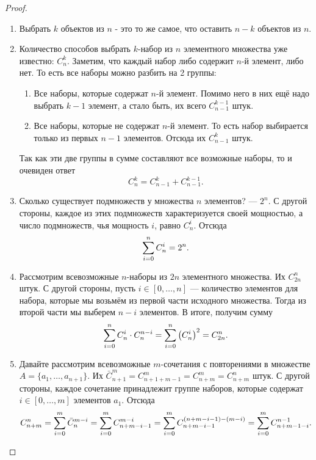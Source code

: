 \begin{proof}~
	\begin{enumerate}
		\item Выбрать $k$ объектов из $n$ - это то же самое, что оставить $n - k$ объектов из $n$.
		
		\item Количество способов выбрать $k$-набор из $n$ элементного множества уже известно: $C_n^k$. Заметим, что каждый набор либо содержит $n$-й элемент, либо нет. То есть все наборы можно разбить на 2 группы:
		\begin{enumerate}
			\item Все наборы, которые содержат $n$-й элемент. Помимо него в них ещё надо выбрать $k - 1$ элемент, а стало быть, их всего $C_{n - 1}^{k - 1}$ штук.
			
			\item Все наборы, которые не содержат $n$-й элемент. То есть набор выбирается только из первых $n - 1$ элементов. Отсюда их $C_{n - 1}^k$ штук.
		\end{enumerate}
		Так как эти две группы в сумме составляют все возможные наборы, то и очевиден ответ
		\[
			C_n^k = C_{n - 1}^k + C_{n - 1}^{k - 1}.
		\]
		
		\item Сколько существует подмножеств у множества $n$ элементов? --- $2^n$. С другой стороны, каждое из этих подмножеств характеризуется своей мощностью, а число подмножеств, чья мощность $i$, равно $C_n^i$. Отсюда
		\[
			\sum\limits_{i = 0}^n C_n^i = 2^n.
		\]
		
		\item Рассмотрим всевозможные $n$-наборы из $2n$ элементного множества. Их $C_{2n}^n$ штук. С другой стороны, пусть $i \in [0, \ldots, n]$ --- количество элементов для набора, которые мы возьмём из первой части исходного множества. Тогда из второй части мы выберем $n - i$ элементов. В итоге, получим сумму
		\[
			\sum\limits_{i = 0}^n C_n^i \cdot C_n^{n - i} = \sum\limits_{i = 0}^n \left(C_n^i\right)^2 = C_{2n}^n.
		\]
		
		\item Давайте рассмотрим всевозможные $m$-сочетания с повторениями в множестве $A = \{a_1, \ldots, a_{n + 1}\}$. Их $\bar{C}_{n + 1}^m = C_{n + 1 + m - 1}^m = C_{n + m}^m = C_{n + m}^n$ штук. С другой стороны, каждое сочетание принадлежит группе наборов, которые содержат $i \in [0, \ldots, m]$ элементов $a_1$. Отсюда
		\[
			C_{n + m}^n = \sum\limits_{i = 0}^m \bar{C}_n^{m - i} = \sum\limits_{i = 0}^m C_{n + m - i - 1}^{m - i} = \sum\limits_{i = 0}^m C_{n + m - i - 1}^{(n + m - i - 1) - (m - i)} = \sum\limits_{i = 0}^m C_{n + m - 1 - i}^{n - 1}.
		\]
	\end{enumerate}
\end{proof}